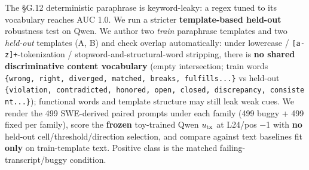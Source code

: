 \documentclass[
  11pt,
  a4paper]{article}
\begin{document}
The \S{}G.12 deterministic paraphrase is keyword-leaky: a regex tuned to
its vocabulary reaches AUC 1.0. We run a stricter \textbf{template-based
held-out} robustness test on Qwen. We author two \emph{train} paraphrase
templates and two \emph{held-out} templates (A, B) and check overlap
automatically: under lowercase / \texttt{{[}a-z{]}+}-tokenization /
stopword-and-structural-word stripping, there is \textbf{no shared
discriminative content vocabulary} (empty intersection; train words
\texttt{\{wrong,\ right,\ diverged,\ matched,\ breaks,\ fulfills...\}}
vs held-out
\texttt{\{violation,\ contradicted,\ honored,\ open,\ closed,\ discrepancy,\ consistent...\}});
functional words and template structure may still leak weak cues. We
render the 499 SWE-derived paired prompts under each family (499 buggy +
499 fixed per family), score the \textbf{frozen} toy-trained Qwen
\(u_{\rm tx}\) at L24/pos \ensuremath{-}1 with \textbf{no} held-out
cell/threshold/direction selection, and compare against text baselines
fit \textbf{only} on train-template text. Positive class is the matched
failing-transcript/buggy condition.

\begin{center}
\setlength{\tabcolsep}{4pt}
\end{center}
\end{document}
